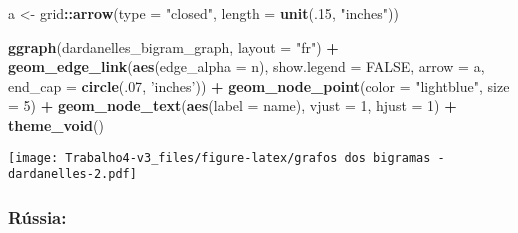 \documentclass[]{article}
\newenvironment{Shaded}{\begin{snugshade}}{\end{snugshade}}
\newcommand{\DataTypeTok}[1]{\textcolor[rgb]{0.13,0.29,0.53}{#1}}
\newcommand{\DecValTok}[1]{\textcolor[rgb]{0.00,0.00,0.81}{#1}}
\newcommand{\KeywordTok}[1]{\textcolor[rgb]{0.13,0.29,0.53}{\textbf{#1}}}
\newcommand{\NormalTok}[1]{#1}
\newcommand{\OperatorTok}[1]{\textcolor[rgb]{0.81,0.36,0.00}{\textbf{#1}}}
\newcommand{\OtherTok}[1]{\textcolor[rgb]{0.56,0.35,0.01}{#1}}
\newcommand{\StringTok}[1]{\textcolor[rgb]{0.31,0.60,0.02}{#1}}
\begin{document}
\begin{Shaded}
\begin{Highlighting}[]
\NormalTok{a <-}\StringTok{ }\NormalTok{grid}\OperatorTok{::}\KeywordTok{arrow}\NormalTok{(}\DataTypeTok{type =} \StringTok{"closed"}\NormalTok{, }\DataTypeTok{length =} \KeywordTok{unit}\NormalTok{(.}\DecValTok{15}\NormalTok{, }\StringTok{"inches"}\NormalTok{))}

\KeywordTok{ggraph}\NormalTok{(dardanelles_bigram_graph, }\DataTypeTok{layout =} \StringTok{"fr"}\NormalTok{) }\OperatorTok{+}
\StringTok{  }\KeywordTok{geom_edge_link}\NormalTok{(}\KeywordTok{aes}\NormalTok{(}\DataTypeTok{edge_alpha =}\NormalTok{ n), }\DataTypeTok{show.legend =} \OtherTok{FALSE}\NormalTok{,}
                 \DataTypeTok{arrow =}\NormalTok{ a, }\DataTypeTok{end_cap =} \KeywordTok{circle}\NormalTok{(.}\DecValTok{07}\NormalTok{, }\StringTok{'inches'}\NormalTok{)) }\OperatorTok{+}
\StringTok{  }\KeywordTok{geom_node_point}\NormalTok{(}\DataTypeTok{color =} \StringTok{"lightblue"}\NormalTok{, }\DataTypeTok{size =} \DecValTok{5}\NormalTok{) }\OperatorTok{+}
\StringTok{  }\KeywordTok{geom_node_text}\NormalTok{(}\KeywordTok{aes}\NormalTok{(}\DataTypeTok{label =}\NormalTok{ name), }\DataTypeTok{vjust =} \DecValTok{1}\NormalTok{, }\DataTypeTok{hjust =} \DecValTok{1}\NormalTok{) }\OperatorTok{+}
\StringTok{  }\KeywordTok{theme_void}\NormalTok{()}
\end{Highlighting}
\end{Shaded}

\texttt{[image: Trabalho4-v3\_files/figure-latex/grafos dos bigramas - dardanelles-2.pdf]}

\hypertarget{russia-5}{%
\subsubsection{Rússia:}\label{russia-5}}

\begin{Shaded}
\end{Shaded}
\end{document}
